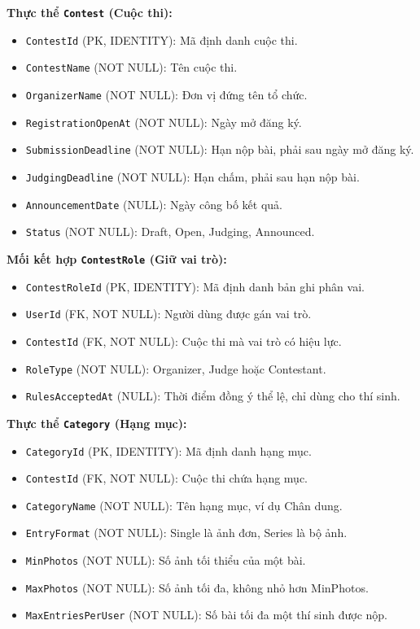 \noindent\textbf{Thực thể \texttt{Contest} (Cuộc thi):}

\begin{itemize}
    \item \texttt{ContestId} (PK, IDENTITY): Mã định danh cuộc thi.
    \item \texttt{ContestName} (NOT NULL): Tên cuộc thi.
    \item \texttt{OrganizerName} (NOT NULL): Đơn vị đứng tên tổ chức.
    \item \texttt{RegistrationOpenAt} (NOT NULL): Ngày mở đăng ký.
    \item \texttt{SubmissionDeadline} (NOT NULL): Hạn nộp bài, phải sau ngày mở đăng ký.
    \item \texttt{JudgingDeadline} (NOT NULL): Hạn chấm, phải sau hạn nộp bài.
    \item \texttt{AnnouncementDate} (NULL): Ngày công bố kết quả.
    \item \texttt{Status} (NOT NULL): Draft, Open, Judging, Announced.
\end{itemize}

\noindent\textbf{Mối kết hợp \texttt{ContestRole} (Giữ vai trò):}

\begin{itemize}
    \item \texttt{ContestRoleId} (PK, IDENTITY): Mã định danh bản ghi phân vai.
    \item \texttt{UserId} (FK, NOT NULL): Người dùng được gán vai trò.
    \item \texttt{ContestId} (FK, NOT NULL): Cuộc thi mà vai trò có hiệu lực.
    \item \texttt{RoleType} (NOT NULL): Organizer, Judge hoặc Contestant.
    \item \texttt{RulesAcceptedAt} (NULL): Thời điểm đồng ý thể lệ, chỉ dùng cho thí sinh.
\end{itemize}

\noindent\textbf{Thực thể \texttt{Category} (Hạng mục):}

\begin{itemize}
    \item \texttt{CategoryId} (PK, IDENTITY): Mã định danh hạng mục.
    \item \texttt{ContestId} (FK, NOT NULL): Cuộc thi chứa hạng mục.
    \item \texttt{CategoryName} (NOT NULL): Tên hạng mục, ví dụ Chân dung.
    \item \texttt{EntryFormat} (NOT NULL): Single là ảnh đơn, Series là bộ ảnh.
    \item \texttt{MinPhotos} (NOT NULL): Số ảnh tối thiểu của một bài.
    \item \texttt{MaxPhotos} (NOT NULL): Số ảnh tối đa, không nhỏ hơn MinPhotos.
    \item \texttt{MaxEntriesPerUser} (NOT NULL): Số bài tối đa một thí sinh được nộp.
\end{itemize}

